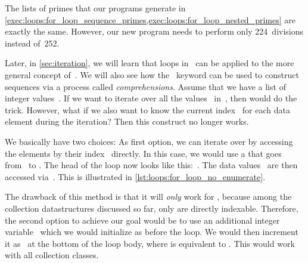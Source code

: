 The lists of primes that our programs generate in \cref{exec:loops:for_loop_sequence_primes,exec:loops:for_loop_nested_primes} are exactly the same.
However, our new program needs to perform only 224~divisions instead of~252.

Later, in \cref{sec:iteration}, we will learn that loops in \python\ can be applied to the more general concept of~.
We will also see how the ~keyword can be used to construct sequences via a process called \emph{comprehensions}.%
%
\FloatBarrier%
\endhsection%
%
%
\label{sec:enumOverSequences}%
%
%
%
%
Assume that we have a list  of integer values~.
If we want to iterate over all the values~ in~, then  would do the trick.
However, what if we also want to know the current index~ for each data element during the iteration?
Then this construct no longer works.

We basically have two choices:
As first option, we can iterate over  by accessing the elements by their index~ directly.
In this case, we would use a  that goes from~ to .
The head of the loop now looks like this:~.
The data values~ are then accessed via~.
This is illustrated in \cref{lst:loops:for_loop_no_enumerate}.

The drawback of this method is that it will \emph{only} work for , because among the collection datastructures discussed so far, only  are directly indexable.
Therefore, the second option to achieve our goal would be to use an additional integer variable~ which we would initialize as  before the loop.
 We would then increment it as~ at the bottom of the loop body, where  is equivalent to \pythonIdx{+=}\pythonIdx{+}.
This would work with all collection classes.

